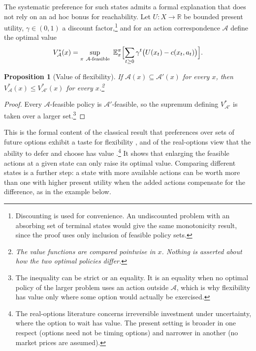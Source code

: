 \documentclass[11pt]{article}
\newtheorem{proposition}{Proposition}
\theoremstyle{remark}
\newcommand{\R}{\mathbb{R}}
\newcommand{\E}{\mathbb{E}}
\begin{document}
The systematic preference for such states admits a formal explanation that does not rely on an ad hoc bonus for reachability. Let $U:X\to\R$ be bounded present utility, $\gamma\in(0,1)$ a discount factor,\footnote{Discounting is used for convenience. An undiscounted problem with an absorbing set of terminal states would give the same monotonicity result, since the proof uses only inclusion of feasible policy sets.} and for an action correspondence $\mathcal A$ define the optimal value
\[
V^\ast_{\mathcal A}(x)=\sup_{\pi\ \mathcal A\text{-feasible}}\ \E^\pi_x\Bigl[\sum_{t\ge0}\gamma^t\bigl(U(x_t)-c(x_t,a_t)\bigr)\Bigr].
\]

\begin{proposition}[Value of flexibility]
If $\mathcal A(x)\subseteq\mathcal A'(x)$ for every $x$, then $V^\ast_{\mathcal A}(x)\le V^\ast_{\mathcal A'}(x)$ for every $x$.\footnote{The value functions are compared pointwise in $x$. Nothing is asserted about how the two optimal policies differ.}
\end{proposition}

\begin{proof}
Every $\mathcal A$-feasible policy is $\mathcal A'$-feasible, so the supremum defining $V^\ast_{\mathcal A'}$ is taken over a larger set.\footnote{The inequality can be strict or an equality. It is an equality when no optimal policy of the larger problem uses an action outside $\mathcal A$, which is why flexibility has value only where some option would actually be exercised.}
\end{proof}

This is the formal content of the classical result that preferences over sets of future options exhibit a taste for flexibility \cite{koopmans,kreps}, and of the real-options view that the ability to defer and choose has value \cite{dixit}.\footnote{The real-options literature concerns irreversible investment under uncertainty, where the option to wait has value. The present setting is broader in one respect (options need not be timing options) and narrower in another (no market prices are assumed).} It shows that enlarging the feasible actions at a given state can only raise its optimal value. Comparing different states is a further step: a state with more available actions can be worth more than one with higher present utility when the added actions compensate for the difference, as in the example below.
\end{document}
